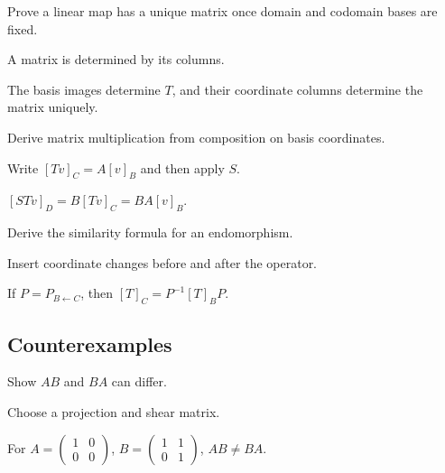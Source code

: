 \begin{exercise}\label{exr:i07-expand-07}
Prove a linear map has a unique matrix once domain and codomain bases are fixed.
\end{exercise}
\begin{hint}
A matrix is determined by its columns.
\end{hint}
\begin{solution}
The basis images determine \(T\), and their coordinate columns determine the matrix uniquely.
\end{solution}

\begin{exercise}\label{exr:i07-expand-08}
Derive matrix multiplication from composition on basis coordinates.
\end{exercise}
\begin{hint}
Write \([Tv]_C=A[v]_B\) and then apply \(S\).
\end{hint}
\begin{solution}
\([STv]_D=B[Tv]_C=BA[v]_B\).
\end{solution}

\begin{exercise}\label{exr:i07-expand-09}
Derive the similarity formula for an endomorphism.
\end{exercise}
\begin{hint}
Insert coordinate changes before and after the operator.
\end{hint}
\begin{solution}
If \(P=P_{B\leftarrow C}\), then \([T]_C=P^{-1}[T]_BP\).
\end{solution}

\subsection*{Counterexamples}

\begin{exercise}\label{exr:i07-expand-10}
Show \(AB\) and \(BA\) can differ.
\end{exercise}
\begin{hint}
Choose a projection and shear matrix.
\end{hint}
\begin{solution}
For \(A=\begin{pmatrix}1&0\\0&0\end{pmatrix}\), \(B=\begin{pmatrix}1&1\\0&1\end{pmatrix}\), \(AB\neq BA\).
\end{solution}

